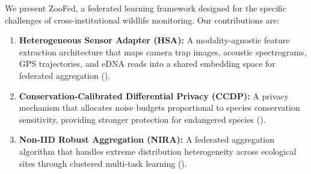 We present ZooFed, a federated learning framework designed for the specific challenges of cross-institutional wildlife monitoring.
Our contributions are:

\begin{enumerate}[leftmargin=*]
    \item \textbf{Heterogeneous Sensor Adapter (HSA):} A modality-agnostic feature extraction architecture that maps camera trap images, acoustic spectrograms, GPS trajectories, and eDNA reads into a shared embedding space for federated aggregation ().
    \item \textbf{Conservation-Calibrated Differential Privacy (CCDP):} A privacy mechanism that allocates noise budgets proportional to species conservation sensitivity, providing stronger protection for endangered species ().
    \item \textbf{Non-IID Robust Aggregation (NIRA):} A federated aggregation algorithm that handles extreme distribution heterogeneity across ecological sites through clustered multi-task learning ().
\end{enumerate}

